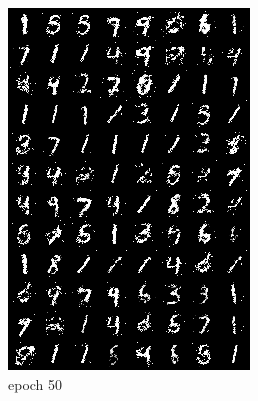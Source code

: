 \documentclass[a4paper]{article}
\theoremstyle{definition}
\begin{document}
\begin{enumerate} [label=(\alph*)]
\begin{figure}[H]
\begin{subfigure}[b]{0.28\textwidth}
				\includegraphics[width=\textwidth]{gen_img50.png}
				\caption{epoch 50}
			\end{subfigure}
			\hfill
			\begin{subfigure}[b]{0.28\textwidth}
				\centering

\end{subfigure}
\end{figure}
\end{enumerate}
\end{document}
